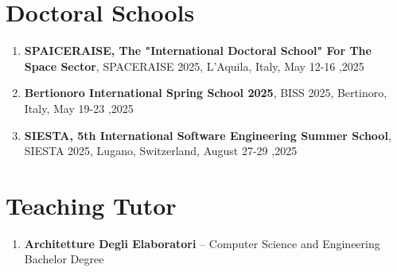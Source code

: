 \documentclass[runningheads]{llncs}
\begin{document}

    \section{Doctoral Schools}
    \begin{enumerate}
        \item \textbf{SPAICERAISE, The "International Doctoral School" For The Space Sector}, SPACERAISE 2025, L'Aquila, Italy, May 12-16 ,2025
        \item \textbf{Bertionoro International Spring School 2025}, BISS 2025, Bertinoro, Italy, May 19-23 ,2025
        \item \textbf{SIESTA, 5th International Software Engineering Summer School}, SIESTA 2025, Lugano, Switzerland, August 27-29 ,2025
    \end{enumerate}

    \section{Teaching Tutor}
    \begin{enumerate}
        \item \textbf{Architetture Degli Elaboratori} -- Computer Science and Engineering Bachelor Degree
    \end{enumerate}
\end{document}
